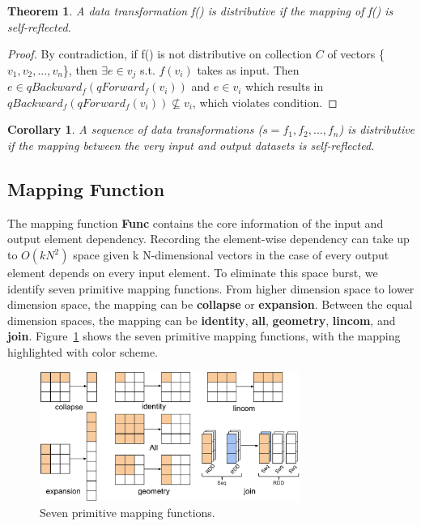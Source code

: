 \documentclass{sig-alternate}
\newtheorem{theorem}{Theorem}[section]
\newtheorem{corollary}{Corollary}[theorem]
\begin{document}
\begin{theorem}
\label{thm:distributive}
A data transformation f() is distributive if the mapping of f() is self-reflected.
\end{theorem}

\begin{proof}
By contradiction, if f() is not distributive on collection $C$ of vectors  \{$v_1, v_2, ..., v_n$\}, then $\exists e \in v_j $ s.t. $f(v_i)$ takes as input.
Then $e \in qBackward_f(qForward_f(v_i))$ and $e \in v_i$ which results in  $qBackward_f(qForward_f(v_i)) \nsubseteq v_i$, which violates condition.
\end{proof}

\begin{corollary}
A sequence of data transformations ($s = {f_1, f_2, ..., f_n}$) is distributive if the mapping between the very input and output datasets is self-reflected.
\end{corollary}

\subsection{Mapping Function}
\label{sec:Map-Func}
The mapping function {\bf Func} contains the core information of the input and output element dependency.
Recording the element-wise dependency can take up to $O(kN^2)$ space given k N-dimensional vectors in the case
of every output element depends on every input element. 
To eliminate this space burst, we identify seven primitive mapping functions.
From higher dimension space to lower dimension space, the mapping can be {\bf collapse} or {\bf expansion}.
Between the equal dimension spaces, the mapping can be {\bf identity}, {\bf all}, {\bf geometry}, {\bf lincom}, and {\bf join}.
Figure~\ref{fig:narrowmapping} shows the seven primitive mapping functions, with the mapping highlighted with color scheme.

\begin{figure}[h]
\begin{center}
    \includegraphics[width=85mm]{pictures/narrowmapping}
\caption {Seven primitive mapping functions.
    \label{fig:narrowmapping}
}
\end{center}
\end{figure}
\end{document}
